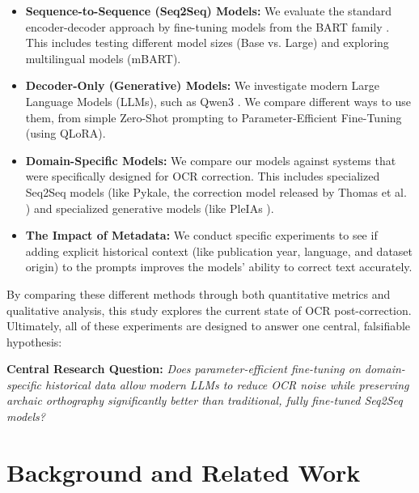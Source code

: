 \documentclass[11pt]{extarticle}
\begin{document}
\begin{itemize}
    \item \textbf{Sequence-to-Sequence (Seq2Seq) Models:} We evaluate the standard encoder-decoder approach by fine-tuning models from the BART family \cite{lewis2019bartdenoisingsequencetosequencepretraining}. This includes testing different model sizes (Base vs. Large) and exploring multilingual models (mBART).
    
    \item \textbf{Decoder-Only (Generative) Models:} We investigate modern Large Language Models (LLMs), such as Qwen3 \cite{yang2025qwen3technicalreport}. We compare different ways to use them, from simple Zero-Shot prompting to Parameter-Efficient Fine-Tuning (using QLoRA).
    
    \item \textbf{Domain-Specific Models:} We compare our models against systems that were specifically designed for OCR correction. This includes specialized Seq2Seq models (like Pykale, the correction model released by Thomas et al. \cite{thomas-etal-2024-leveraging}) and specialized generative models (like PleIAs \cite{pleIAs}).
    
    \item \textbf{The Impact of Metadata:} We conduct specific experiments to see if adding explicit historical context (like publication year, language, and dataset origin) to the prompts improves the models' ability to correct text accurately.
\end{itemize}

By comparing these different methods through both quantitative metrics and qualitative analysis, this study explores the current state of OCR post-correction. Ultimately, all of these experiments are designed to answer one central, falsifiable hypothesis:

\begin{mdframed}[backgroundcolor=gray!10, linewidth=0pt, innertopmargin=10pt, innerbottommargin=10pt, innerleftmargin=10pt, innerrightmargin=10pt]
\textbf{Central Research Question:} \textit{Does parameter-efficient fine-tuning on domain-specific historical data allow modern LLMs to reduce OCR noise while preserving archaic orthography significantly better than traditional, fully fine-tuned Seq2Seq models?}
\end{mdframed}


\section{Background and Related Work}
\end{document}
